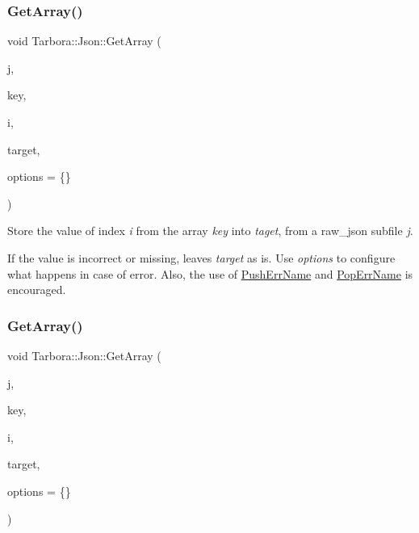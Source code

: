 \subsubsection{\texorpdfstring{Get\+Array()}{GetArray()}\hspace{0.1cm}{\footnotesize\ttfamily [7/12]}}
{\footnotesize\ttfamily void Tarbora\+::\+Json\+::\+Get\+Array (\begin{DoxyParamCaption}\item[{raw\+\_\+json}]{j,  }\item[{const char $\ast$}]{key,  }\item[{int}]{i,  }\item[{raw\+\_\+json $\ast$}]{target,  }\item[{\hyperlink{structTarbora_1_1JsonOptions}{Json\+Options}}]{options = {\ttfamily \{\}} }\end{DoxyParamCaption})}



Store the value of index {\itshape i} from the array {\itshape key} into {\itshape taget}, from a raw\+\_\+json subfile {\itshape j}. 

If the value is incorrect or missing, leaves {\itshape target} as is. Use {\itshape options} to configure what happens in case of error. Also, the use of \hyperlink{classTarbora_1_1Json_a061eac4f16dac3b9b3a26a66de0ea8f0}{Push\+Err\+Name} and \hyperlink{classTarbora_1_1Json_a14019f06d3bd76edd6a6e78134519d11}{Pop\+Err\+Name} is encouraged. \mbox{\label{classTarbora_1_1Json_a2a59a8382b451df04cbd29fa866a8968}} 
\subsubsection{\texorpdfstring{Get\+Array()}{GetArray()}\hspace{0.1cm}{\footnotesize\ttfamily [8/12]}}
{\footnotesize\ttfamily void Tarbora\+::\+Json\+::\+Get\+Array (\begin{DoxyParamCaption}\item[{raw\+\_\+json}]{j,  }\item[{const char $\ast$}]{key,  }\item[{int}]{i,  }\item[{bool $\ast$}]{target,  }\item[{\hyperlink{structTarbora_1_1JsonOptions}{Json\+Options}}]{options = {\ttfamily \{\}} }\end{DoxyParamCaption})}

